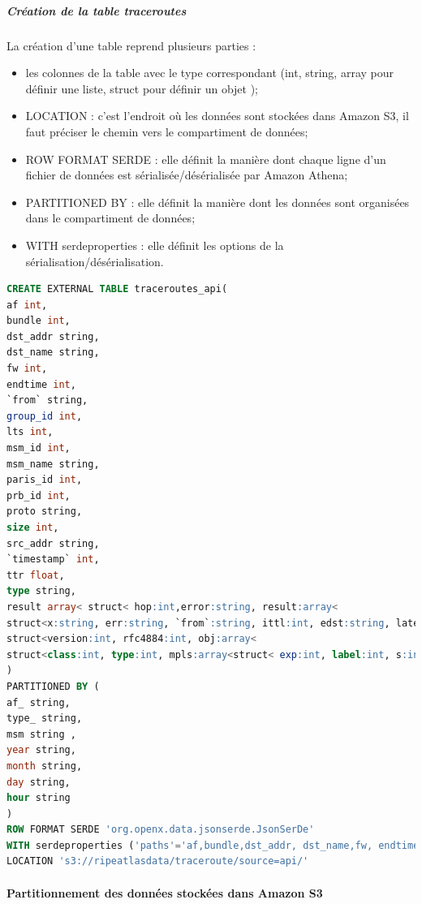 \subparagraph{Création de la table traceroutes } 
La création d'une table reprend plusieurs parties :
\begin{itemize}
	\item les colonnes de la table avec le type correspondant (int, string, array pour définir une liste, struct pour définir un objet );
	\item LOCATION : c'est l'endroit où les données sont stockées dans Amazon S3, il faut préciser le chemin vers le compartiment de données;
	\item ROW FORMAT SERDE : elle définit la manière dont chaque ligne d'un fichier de données est sérialisée/désérialisée par Amazon Athena;
	\item PARTITIONED BY : elle définit la manière dont les données sont organisées dans le compartiment de données; 
	\item WITH serdeproperties : elle définit les options de la sérialisation/désérialisation.
\end{itemize}
\begin{lstlisting}[language=SQL, basicstyle=\footnotesize, label=createAthenaTable, caption={Création de la table des traceroutes dans Amazon Athena }]
CREATE EXTERNAL TABLE traceroutes_api(
af int,
bundle int,
dst_addr string,
dst_name string,
fw int,
endtime int,
`from` string,
group_id int,
lts int,
msm_id int,
msm_name string,
paris_id int,
prb_id int,
proto string,
size int,
src_addr string,
`timestamp` int,
ttr float,
type string,
result array< struct< hop:int,error:string, result:array<
struct<x:string, err:string, `from`:string, ittl:int, edst:string, late:int, mtu:int, rtt:float, size:int, ttl:int , flags:string, dstoptsize:int, hbhoptsize:int, icmpext:
struct<version:int, rfc4884:int, obj:array< 
struct<class:int, type:int, mpls:array<struct< exp:int, label:int, s:int, ttl:int>>>>>>>>> 
)
PARTITIONED BY (
af_ string,
type_ string,
msm string ,
year string,
month string,
day string,
hour string
) 
ROW FORMAT SERDE 'org.openx.data.jsonserde.JsonSerDe'
WITH serdeproperties ('paths'='af,bundle,dst_addr, dst_name,fw, endtime, from, lts, msm_id, paris_id, prb_id, proto, size, src_addr, timestamp, type,fw, msm_name' ) 
LOCATION 's3://ripeatlasdata/traceroute/source=api/'
\end{lstlisting}





\paragraph{Partitionnement des données stockées dans Amazon S3}~

